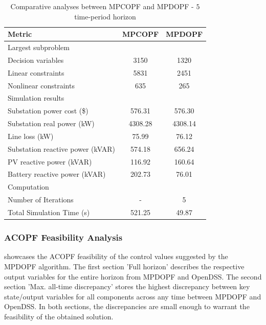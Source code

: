 \documentclass[../../outputs/main.tex]{subfiles}
\begin{document}
\begin{table}[t] %
    \centering
    \caption{Comparative analyses between MPCOPF and MPDOPF - $5$ time-period horizon}
    \begin{tabular}{|l|c|c|}
    \hline
    \textbf{Metric} & \textbf{MPCOPF} & \textbf{MPDOPF} \\ \hline
    Largest subproblem & \multicolumn{2}{c|}{} \\ \hline
    \quad Decision variables & {3150} & {1320} \\ \hline
    \quad Linear constraints & {5831} & {2451} \\ \hline
    \quad Nonlinear constraints & {635} & {265} \\ \hline
    Simulation results  & \multicolumn{2}{c|}{} \\ \hline
    \quad Substation power cost (\$) & 576.31 & 576.30 \\ \hline
    \quad Substation real power (kW) & 4308.28 & 4308.14 \\ \hline
    \quad Line loss (kW) & 75.99 & 76.12 \\ \hline
    \quad Substation reactive power (kVAR) & 574.18 & 656.24 \\ \hline
    \quad PV reactive power (kVAR) & 116.92 & 160.64 \\ \hline
    \quad Battery reactive power (kVAR) & 202.73 & 76.01 \\ \hline
    Computation  & \multicolumn{2}{c|}{} \\ \hline
    \quad Number of Iterations & - & 5 \\ \hline
    \quad Total Simulation Time (s) & 521.25 & 49.87 \\ \hline
    \end{tabular}
    \label{table:opt-5-20-30}
    \vspace{-3mm}
\end{table}

\subsubsection{ACOPF Feasibility Analysis}
 showcases the ACOPF feasibility of the control values suggested by the MPDOPF algorithm. The first section 'Full horizon' describes the respective output variables for the entire horizon from MPDOPF and OpenDSS. The second section 'Max. all-time discrepancy' stores the highest discrepancy between key state/output variables for all components across any time between MPDOPF and OpenDSS. In both sections, the discrepancies are small enough to warrant the feasibility of the obtained solution. 
\end{document}
